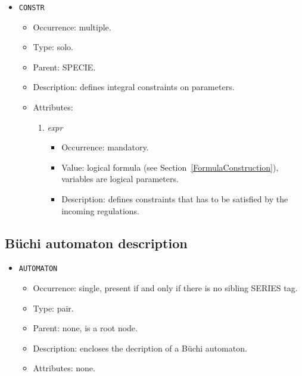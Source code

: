 \documentclass[12pt]{article}
\newenvironment{menum}{
\begin{enumerate}
  \setlength{\itemsep}{0pt}
  \setlength{\parskip}{0pt}
  \setlength{\parsep}{0pt}
}{\end{enumerate}}
\newenvironment{mitem}{
\begin{itemize}
  \setlength{\itemsep}{0pt}
  \setlength{\parskip}{0pt}
  \setlength{\parsep}{0pt}
}{\end{itemize}}
\begin{document}
\begin{mitem}
	\item \texttt{CONSTR}
	\begin{mitem}
		\item Occurrence: multiple.
		\item Type: solo.
		\item Parent: SPECIE.
		\item Description: defines integral constraints on parameters.
		\item Attributes:	
		\begin{menum}
			\item \textit{expr} 
			\begin{mitem}
				\item Occurrence: mandatory.
				\item Value: logical formula (see Section~\ref{FormulaConstruction}), variables are logical parameters.
				\item Description: defines constraints that has to be satisfied by the incoming regulations.
			\end{mitem}
		\end{menum}
	\end{mitem}
\end{mitem}
	
\subsection{B\"uchi automaton description}		
\begin{mitem}
	\item \texttt{AUTOMATON}
	\begin{mitem}
		\item Occurrence: single, present if and only if there is no sibling SERIES tag.
		\item Type: pair.
		\item Parent: none, is a root node.
		\item Description: encloses the decription of a B\"uchi automaton.
		\item Attributes: none.
	\end{mitem}
\end{mitem}		
\end{document}
